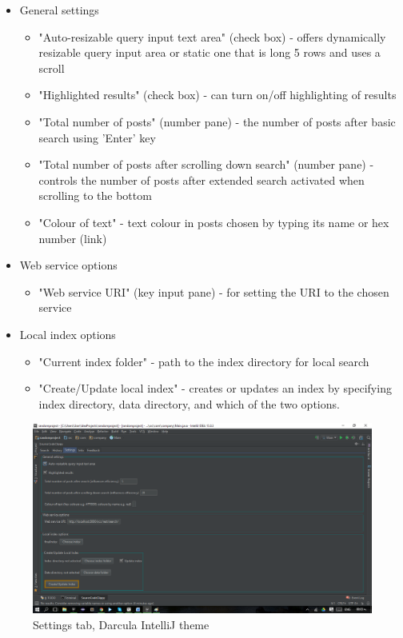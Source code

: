 \documentclass{l4proj}
\begin{document}
\begin{itemize}

\item General settings
\begin{itemize}
\item "Auto-resizable query input text area" (check box) - offers dynamically resizable query input area or static one that is long 5 rows and uses a scroll 
\item "Highlighted results" (check box) - can turn on/off highlighting of results
\item "Total number of posts" (number pane) - the number of posts after basic search using 'Enter' key
\item "Total number of posts after scrolling down search" (number pane) - controls the number of posts after extended search activated when scrolling to the bottom
\item "Colour of text" - text colour in posts chosen by typing its name or hex number (link)
\end{itemize}

\item Web service options
\begin{itemize}
\item "Web service URI" (key input pane) - for setting the URI to the chosen service
\end{itemize}

\item Local index options
\begin{itemize}
\item "Current index folder" - path to the index directory for local search
\item "Create/Update local index" - creates or updates an index by specifying index directory, data directory, and which of the two options.
\end{itemize}

\end{itemize}

\begin{figure}[H]
\includegraphics[scale=0.4]{tab-settings}
\centering
\caption{Settings tab, Darcula IntelliJ theme}
\label{fig:settings-tab}
\end{figure}
\end{document}
